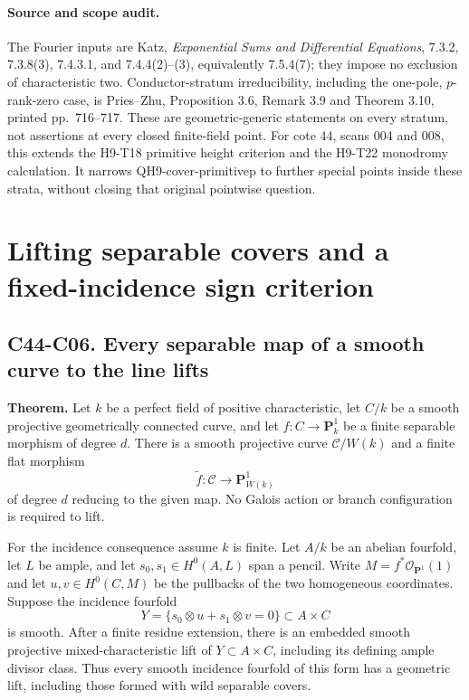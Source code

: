\documentclass[11pt]{article}
\theoremstyle{remark}\newtheorem{remark}[theorem]{Remark}
\begin{document}
\paragraph{Source and scope audit.}
The Fourier inputs are Katz, \emph{Exponential Sums and Differential
Equations}, 7.3.2, 7.3.8(3), 7.4.3.1, and 7.4.4(2)--(3),
equivalently 7.5.4(7); they impose no exclusion of characteristic two.
Conductor-stratum irreducibility, including the one-pole,
\(p\)-rank-zero case, is Pries--Zhu, Proposition 3.6, Remark 3.9
and Theorem 3.10, printed pp.~716--717.
These are geometric-generic statements on every stratum, not
assertions at every closed finite-field point.
For cote 44, scans 004 and 008, this extends the H9-T18 primitive
height criterion and the H9-T22 monodromy calculation. It narrows
QH9-cover-primitivep to further special points inside these strata,
without closing that original pointwise question.


\section{Lifting separable covers and a fixed-incidence sign criterion}
\subsection*{C44-C06. Every separable map of a smooth curve to the line lifts}

\textbf{Theorem.}
Let $k$ be a perfect field of positive characteristic, let $C/k$
be a smooth projective geometrically connected curve, and let
$f:C\to\mathbf P^1_k$ be a finite separable morphism of degree $d$.
There is a smooth projective curve $\mathcal C/W(k)$ and a finite
flat morphism
\[
                   \widetilde f:\mathcal C\longrightarrow
                                    \mathbf P^1_{W(k)}
                                                               \tag{C06.1}
\]
of degree $d$ reducing to the given map.
No Galois action or branch configuration is required to lift.

For the incidence consequence assume $k$ is finite.
Let $A/k$ be an abelian fourfold, let $L$ be ample,
and let $s_0,s_1\in H^0(A,L)$ span a pencil.
Write $M=f^*\mathcal O_{\mathbf P^1}(1)$ and let
$u,v\in H^0(C,M)$ be the pullbacks of the two homogeneous
coordinates. Suppose the incidence fourfold
\[
 Y=\{s_0\otimes u+s_1\otimes v=0\}\subset A\times C
                                                               \tag{C06.2}
\]
is smooth. After a finite residue extension,
there is an embedded smooth projective mixed-characteristic
lift of $Y\subset A\times C$, including its defining ample
divisor class. Thus every smooth incidence fourfold of this
form has a geometric lift, including those formed with wild
separable covers.
\end{document}

